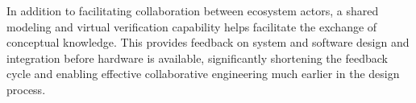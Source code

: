 In addition to facilitating collaboration between ecosystem actors, a shared modeling and virtual verification capability helps facilitate the exchange of conceptual knowledge. 
This provides feedback on system and software design and integration before hardware is available, significantly shortening the feedback cycle and enabling effective collaborative engineering much earlier in the design process.


